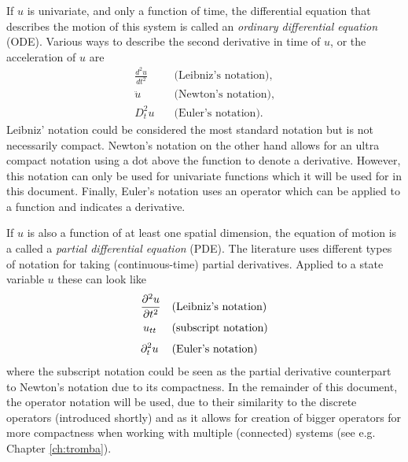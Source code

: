 If $u$ is univariate, and only a function of time, the differential equation that describes the motion of this system is called an \textit{ordinary differential equation} (ODE). Various ways to describe the second derivative in time of $u$, or the acceleration of $u$ are
%
\begin{equation}\nonumber
    \begin{aligned}
        \frac{d^2 u}{d t^2} & \quad \text{(Leibniz's notation)},\\
        \ddot u\ \  &\quad \text{(Newton's notation)},\\[3pt]
        D_t^2 u& \quad \text{(Euler's notation)}.
    \end{aligned}
\end{equation}
%
Leibniz' notation could be considered the most standard notation but is not necessarily compact. Newton's notation on the other hand allows for an ultra compact notation using a dot above the function to denote a derivative. However, this notation can only be used for univariate functions which it will be used for in this document. Finally, Euler's notation uses an operator which can be applied to a function and indicates a derivative.  
 
If $u$ is also a function of at least one spatial dimension, the equation of motion is a called a \textit{partial differential equation} (PDE).
The literature uses different types of notation for taking (continuous-time) partial derivatives. Applied to a state variable $u$ these can look like 
\begin{equation}\nonumber
    \begin{aligned}
        \frac{\partial^2 u}{\partial t^2} & \quad \text{(Leibniz's notation)}\\
        u_{tt}\:\,& \quad \text{(subscript notation)}\\[3pt]
        \partial_t^2 u\: & \quad \text{(Euler's notation)}
    \end{aligned}
\end{equation}
% 
%
%
where the subscript notation could be seen as the partial derivative counterpart to Newton's notation due to its compactness. In the remainder of this document, the operator notation will be used, due to their similarity to the discrete operators (introduced shortly) and as it allows for creation of bigger operators for more compactness when working with multiple (connected) systems (see e.g. Chapter \ref{ch:tromba}).

